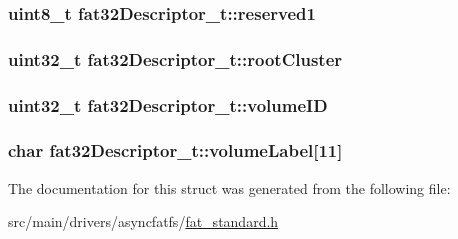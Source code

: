 \hypertarget{structfat32Descriptor__t_acd9947c906ded6154e74f85b616e8d7f}{
\subsubsection[{reserved1}]{\setlength{\rightskip}{0pt plus 5cm}uint8\+\_\+t fat32\+Descriptor\+\_\+t\+::reserved1}}\label{structfat32Descriptor__t_acd9947c906ded6154e74f85b616e8d7f}
\hypertarget{structfat32Descriptor__t_a13436c38d0bbf9d03619a8a3de5b5e39}{
\subsubsection[{root\+Cluster}]{\setlength{\rightskip}{0pt plus 5cm}uint32\+\_\+t fat32\+Descriptor\+\_\+t\+::root\+Cluster}}\label{structfat32Descriptor__t_a13436c38d0bbf9d03619a8a3de5b5e39}
\hypertarget{structfat32Descriptor__t_acd392981355aded3fd49218cb800169d}{
\subsubsection[{volume\+I\+D}]{\setlength{\rightskip}{0pt plus 5cm}uint32\+\_\+t fat32\+Descriptor\+\_\+t\+::volume\+I\+D}}\label{structfat32Descriptor__t_acd392981355aded3fd49218cb800169d}
\hypertarget{structfat32Descriptor__t_a3fa99bc22dea35e9fddf03f5105923fa}{
\subsubsection[{volume\+Label}]{\setlength{\rightskip}{0pt plus 5cm}char fat32\+Descriptor\+\_\+t\+::volume\+Label\mbox{[}11\mbox{]}}}\label{structfat32Descriptor__t_a3fa99bc22dea35e9fddf03f5105923fa}


The documentation for this struct was generated from the following file\+:\begin{DoxyCompactItemize}
\item 
src/main/drivers/asyncfatfs/\hyperlink{fat__standard_8h}{fat\+\_\+standard.\+h}\end{DoxyCompactItemize}
